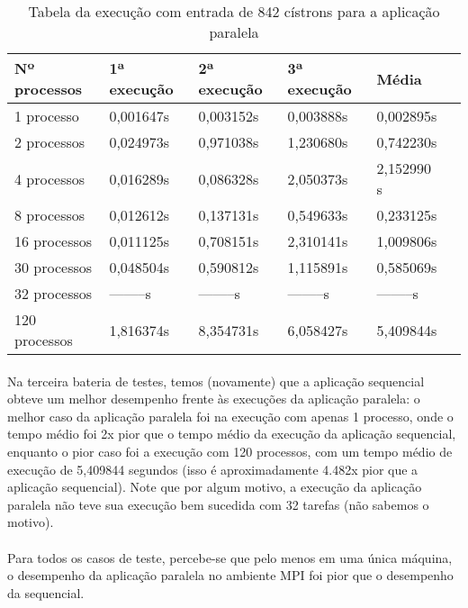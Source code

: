 \documentclass[a4paper,10pt]{article}
\begin{document}
\begin{table}[!htb]
\begin{tabular}{| l | l | l | l | l | p{5cm} |} 
\hline
Nº processos & 1ª execução & 2ª execução & 3ª execução & Média\\ \hline
1  processo & 0,001647s  &  0,003152s  &  0,003888s  &  0,002895s  \\ \hline
2 processos & 0,024973s  &  0,971038s  &  1,230680s  &  0,742230s   \\ \hline
4 processos & 0,016289s  &  0,086328s  &  2,050373s  & 2,152990 s   \\ \hline
8 processos & 0,012612s  &  0,137131s  &  0,549633s  &  0,233125s   \\ \hline
16 processos & 0,011125s  &  0,708151s  &  2,310141s  &  1,009806s     \\ \hline
30 processos & 0,048504s  &  0,590812s  &  1,115891s  &  0,585069s\\ \hline
32 processos & --------s  &  --------s  &  --------s  &  --------s  \\ \hline
120 processos & 1,816374s  &  8,354731s  &  6,058427s  &  5,409844s\\ \hline
\end{tabular}
\caption{Tabela da execução com entrada de 842 cístrons para a aplicação paralela}
\end{table}
\newpage

\paragraph{} Na terceira bateria de testes, temos (novamente) que a aplicação sequencial obteve um melhor desempenho frente às execuções da aplicação paralela: o melhor caso da aplicação paralela foi na execução com apenas 1 processo, onde o tempo médio foi 2x pior que o tempo médio da execução da aplicação sequencial, enquanto o pior caso foi a execução com 120 processos, com um tempo médio de execução de 5,409844 segundos (isso é aproximadamente 4.482x pior que a aplicação sequencial). Note que por algum motivo, a execução da aplicação paralela não teve sua execução bem sucedida com 32 tarefas (não sabemos o motivo).\\
\paragraph{}Para todos os casos de teste, percebe-se que pelo menos em uma única máquina, o desempenho da aplicação paralela no ambiente MPI foi pior que o desempenho da sequencial.\\





\end{document}
